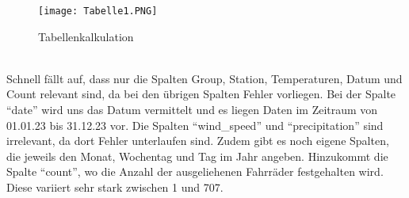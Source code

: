 \documentclass[1pt]{article}
\begin{document}
\begin{figure}[h] %
    \centering %
    \texttt{[image: Tabelle1.PNG]} %
    \caption{Tabellenkalkulation}
   \label{fig:meinBild} %
\end{figure}
\vspace{1cm}\
\\Schnell fällt auf, dass nur die Spalten Group, Station, Temperaturen, Datum und Count relevant sind, da bei den übrigen Spalten Fehler vorliegen. Bei der Spalte \enquote{date} wird uns das Datum vermittelt und es liegen Daten im Zeitraum von 01.01.23 bis 31.12.23 vor. Die Spalten \enquote{wind\_speed} und \enquote{precipitation} sind irrelevant, da dort Fehler unterlaufen sind. Zudem gibt es noch eigene Spalten, die jeweils den Monat, Wochentag und Tag im Jahr angeben. Hinzukommt die Spalte \enquote{count}, wo die Anzahl der ausgeliehenen Fahrräder festgehalten wird. Diese variiert sehr stark zwischen 1 und 707.
\\
\newpage
\end{document}
